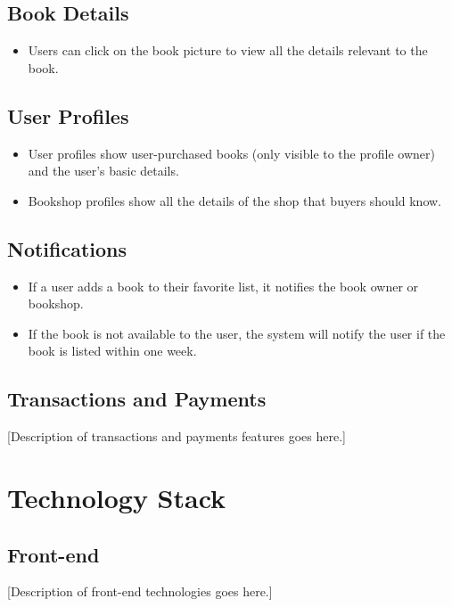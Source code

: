 \subsection{Book Details}
\begin{itemize}
  \item Users can click on the book picture to view all the details relevant to the book.
\end{itemize}

\subsection{User Profiles}
\begin{itemize}
  \item User profiles show user-purchased books (only visible to the profile owner) and the user's basic details.
  \item Bookshop profiles show all the details of the shop that buyers should know.
\end{itemize}

\subsection{Notifications}
\begin{itemize}
  \item If a user adds a book to their favorite list, it notifies the book owner or bookshop.
  \item If the book is not available to the user, the system will notify the user if the book is listed within one week.
\end{itemize}

\subsection{Transactions and Payments}
[Description of transactions and payments features goes here.]

\section{Technology Stack}

\subsection{Front-end}
[Description of front-end technologies goes here.]

